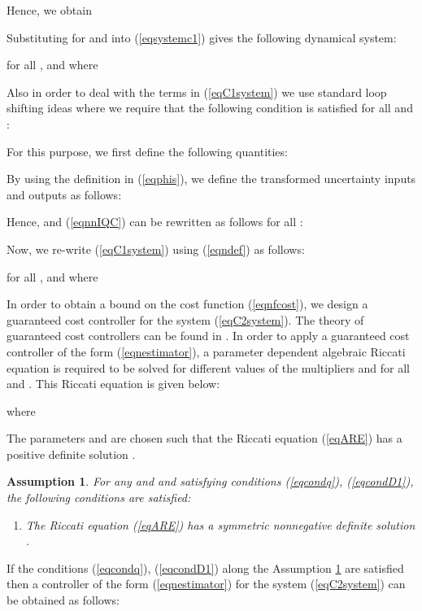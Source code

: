 \documentclass[twocolumn]{autart}
\newtheorem{assumption}{Assumption}
\begin{document}
Hence, we obtain

Substituting for  and  into (\ref{eqsystemc1}) gives the following dynamical system:

for all , and  where
\begin{small}

\end{small}

\noindent Also in order to deal with the  terms in (\ref{eqC1system}) we use  standard loop shifting ideas \cite{outputfeedback_petersen,Basar_book} where we require that the following condition is satisfied for all  and : 

For this purpose, we first define the following quantities:

By using the definition in (\ref{eqphis}), we define the transformed uncertainty inputs and outputs as follows:

Hence, 
and (\ref{eqnnIQC}) can be rewritten as follows for all :
\begin{small}

\end{small} 
Now, we re-write (\ref{eqC1system}) using (\ref{eqndef}) as follows:

for all , and  where
\begin{small}

\end{small}

\noindent In order to obtain a bound on the cost function (\ref{eqnfcost}), we design a guaranteed cost controller for the system (\ref{eqC2system}). The theory of guaranteed cost controllers can be found in \cite{IP}. 
In order to apply a guaranteed cost controller of the form (\ref{eqnestimator}), a parameter dependent algebraic Riccati equation is required to be solved for different values of the multipliers  and  for all   and . This Riccati equation is given below:
\begin{small}

\end{small}
where
\begin{small}

\end{small}

\noindent The parameters  and  are chosen such that the Riccati equation (\ref{eqARE}) has a positive definite solution .
\begin{assumption}\label{Ass1}
For any  and   and  satisfying conditions (\ref{eqcondq}), (\ref{eqcondD1}), the following conditions are satisfied:
\begin{enumerate}
\item The Riccati equation (\ref{eqARE}) has a symmetric nonnegative definite solution .
\end{enumerate}
\end{assumption}
\vspace{0.2mm}
If the conditions (\ref{eqcondq}), (\ref{eqcondD1}) along the Assumption \ref{Ass1} are satisfied then a controller of the form (\ref{eqnestimator}) for the system (\ref{eqC2system}) can be obtained as follows:
\end{document}
